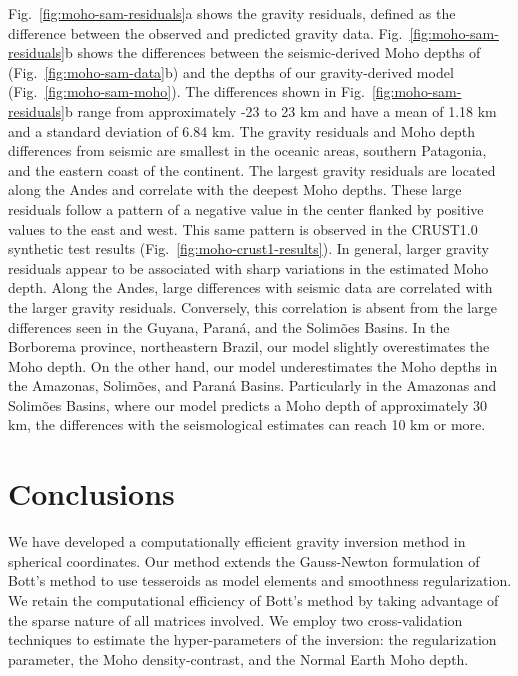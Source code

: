 Fig.~\ref{fig:moho-sam-residuals}a shows the gravity residuals,
defined as the difference between the observed and predicted gravity data.
Fig.~\ref{fig:moho-sam-residuals}b shows the differences between
the seismic-derived Moho depths of \citet{assumpcao2013a}
(Fig.~\ref{fig:moho-sam-data}b) and the depths of our gravity-derived model
(Fig.~\ref{fig:moho-sam-moho}).
The differences shown in Fig.~\ref{fig:moho-sam-residuals}b range from approximately
-23 to 23 km and have a mean of 1.18 km and a standard deviation of 6.84 km.
The gravity residuals and Moho depth differences from seismic are smallest in
the oceanic areas, southern Patagonia, and the eastern coast of the continent.
The largest gravity residuals are located along the Andes and correlate with
the deepest Moho depths.
These large residuals follow a pattern of a negative value in the center
flanked by positive values to the east and west.
This same pattern is observed in the CRUST1.0 synthetic test results
(Fig.~\ref{fig:moho-crust1-results}).
In general, larger gravity residuals appear to be associated with sharp
variations in the estimated Moho depth.
Along the Andes, large differences with seismic data are correlated with the
larger gravity residuals.
Conversely, this correlation is absent from the large differences seen in the
Guyana, Paraná, and the Solimões Basins.
In the Borborema province, northeastern Brazil,
our model slightly overestimates the Moho depth.
On the other hand, our model underestimates the Moho depths in the Amazonas,
Solimões, and Paraná Basins.
Particularly in the Amazonas and Solimões Basins, where our model predicts a
Moho depth of approximately 30 km, the differences with the seismological
estimates can reach 10 km or more.



\section{Conclusions}

We have developed a computationally efficient gravity inversion method in
spherical coordinates.
Our method extends the Gauss-Newton formulation of Bott's method
\citep{silva2014} to use tesseroids as model elements and smoothness
regularization.
We retain the computational efficiency of Bott's method by taking advantage of
the sparse nature of all matrices involved.
We employ two cross-validation techniques to estimate the hyper-parameters of
the inversion: the regularization parameter, the Moho density-contrast, and the
Normal Earth Moho depth.


